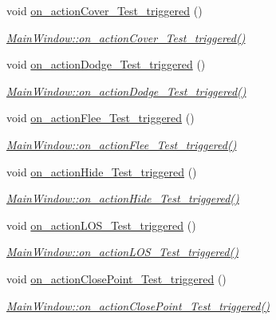 \begin{DoxyCompactItemize}
void \hyperlink{class_main_window_a490e7af6d6dfb464cefc5e6ae65c6ab3}{on\+\_\+action\+Cover\+\_\+\+Test\+\_\+triggered} ()
\begin{DoxyCompactList}\small\item\em \hyperlink{class_main_window_a490e7af6d6dfb464cefc5e6ae65c6ab3}{Main\+Window\+::on\+\_\+action\+Cover\+\_\+\+Test\+\_\+triggered()} \end{DoxyCompactList}\item 
void \hyperlink{class_main_window_a7f4c3556edcac3d936562bf4d56f25ba}{on\+\_\+action\+Dodge\+\_\+\+Test\+\_\+triggered} ()
\begin{DoxyCompactList}\small\item\em \hyperlink{class_main_window_a7f4c3556edcac3d936562bf4d56f25ba}{Main\+Window\+::on\+\_\+action\+Dodge\+\_\+\+Test\+\_\+triggered()} \end{DoxyCompactList}\item 
void \hyperlink{class_main_window_aa7c4d3fb11b9a0b3e4913e83c2a141c4}{on\+\_\+action\+Flee\+\_\+\+Test\+\_\+triggered} ()
\begin{DoxyCompactList}\small\item\em \hyperlink{class_main_window_aa7c4d3fb11b9a0b3e4913e83c2a141c4}{Main\+Window\+::on\+\_\+action\+Flee\+\_\+\+Test\+\_\+triggered()} \end{DoxyCompactList}\item 
void \hyperlink{class_main_window_ac7fa56ba40ceb9eabb87920a65ff78d8}{on\+\_\+action\+Hide\+\_\+\+Test\+\_\+triggered} ()
\begin{DoxyCompactList}\small\item\em \hyperlink{class_main_window_ac7fa56ba40ceb9eabb87920a65ff78d8}{Main\+Window\+::on\+\_\+action\+Hide\+\_\+\+Test\+\_\+triggered()} \end{DoxyCompactList}\item 
void \hyperlink{class_main_window_a5d11efcec7d4b4bcca2b9de7df348a1d}{on\+\_\+action\+L\+O\+S\+\_\+\+Test\+\_\+triggered} ()
\begin{DoxyCompactList}\small\item\em \hyperlink{class_main_window_a5d11efcec7d4b4bcca2b9de7df348a1d}{Main\+Window\+::on\+\_\+action\+L\+O\+S\+\_\+\+Test\+\_\+triggered()} \end{DoxyCompactList}\item 
void \hyperlink{class_main_window_a5f7a6767c44f88599408d3494ff7239d}{on\+\_\+action\+Close\+Point\+\_\+\+Test\+\_\+triggered} ()
\begin{DoxyCompactList}\small\item\em \hyperlink{class_main_window_a5f7a6767c44f88599408d3494ff7239d}{Main\+Window\+::on\+\_\+action\+Close\+Point\+\_\+\+Test\+\_\+triggered()} \end{DoxyCompactList}\item 

\end{DoxyCompactItemize}
